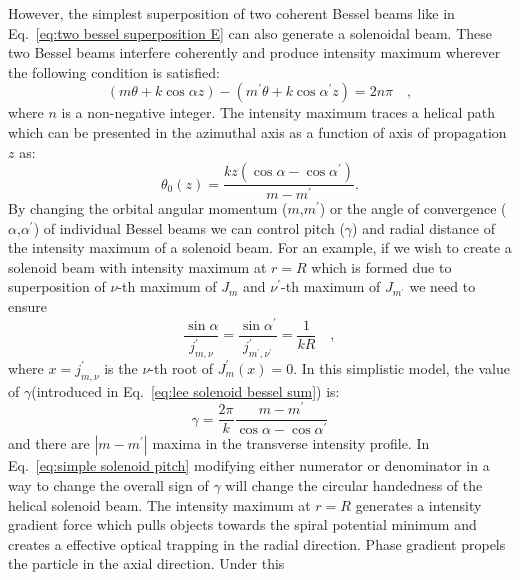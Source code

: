 However, the simplest superposition of two coherent Bessel beams like in Eq.~\eqref{eq:two bessel superposition E} can also generate a solenoidal beam. These two Bessel beams interfere coherently and produce intensity maximum wherever the following condition is satisfied:
\begin{equation}
\label{eq:solenoid superposition bessel phase}
\left( m\theta + k\cos \alpha z \right) -\left(m^{\prime}\theta + k\cos \alpha ^{\prime} z \right) = 2n\pi \quad ,
\end{equation}
where $n$ is a non-negative integer. The intensity maximum traces a helical path which can be presented in the azimuthal axis as a function of axis of propagation $z$ as:
\begin{equation}
\label{eq:screw function}
\theta _{0}(z) = \frac{kz\left( \cos \alpha - \cos \alpha ^{\prime}\right)}{m-m^{\prime}} .
\end{equation}
By changing the orbital angular momentum ($m$,$m^{\prime}$) or the angle of convergence ($\alpha$,$\alpha ^{\prime}$) of individual Bessel beams we can control pitch ($\gamma$) and radial distance of the intensity maximum of a solenoid beam. For an example, if we wish to create a solenoid beam with intensity maximum at $r=R$ which is formed due to superposition of  $\nu$-th maximum of $J_m$ and $\nu ^{\prime}$-th maximum of $J_{m^{\prime}}$ we need to ensure
\begin{equation}
\label{eq:bessel maximum match condition}
\frac{\sin \alpha}{j^{\prime}_{m,\nu}} 
		= \frac{\sin \alpha ^{\prime}}{j^{\prime}_{m^{\prime},\nu ^{\prime}}} 
		= \frac{1}{kR} \quad ,
\end{equation}
where $x=j^{\prime}_{m,\nu}$ is the $\nu$-th root of $J^{\prime}_{m}\left( x\right)=0$. In this simplistic model, the value of $\gamma$(introduced in Eq.~\eqref{eq:lee solenoid bessel sum}) is:
\begin{equation}
\label{eq:simple solenoid pitch}
\gamma = \frac{2\pi}{k}\frac{m-m^{\prime}}{\cos \alpha - \cos \alpha ^{\prime}}
\end{equation}
and there are $|m-m^{\prime}|$ maxima in the transverse intensity profile. In Eq.~\eqref{eq:simple solenoid pitch} modifying either numerator or denominator in a way to change the overall sign of $\gamma$ will change the circular handedness of the helical solenoid beam. The intensity maximum at $r=R$ generates a intensity gradient force which pulls objects towards the spiral potential minimum and creates a effective optical trapping in the radial direction. Phase gradient propels the particle in the axial direction. Under this
